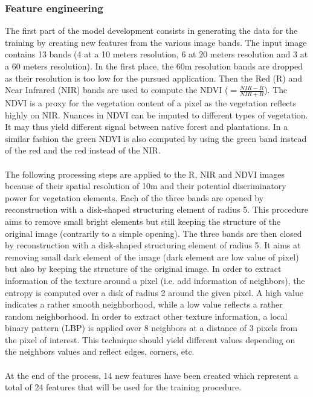 \documentclass[a4paper, 12pt]{article}
\begin{document}
        \subsubsection{Feature engineering}
            The first part of the model development consists in generating the data for the training by creating new features from the various image bands. The input image contains 13 bands (4 at a 10 meters resolution, 6 at 20 meters resolution and 3 at a 60 meters resolution). In the first place, the 60m resolution bands are dropped as their resolution is too low for the pursued application. Then the Red (R) and Near Infrared (NIR) bands are used to compute the NDVI ($= \tfrac{NIR - R}{NIR + R}$). The NDVI is a proxy for the vegetation content of a pixel as the vegetation reflects highly on NIR. Nuances in NDVI can be imputed to different types of vegetation. It may thus yield different signal between native forest and plantations. In a similar fashion the green NDVI is also computed by using the green band instead of the red and the red instead of the NIR.
            \\
            \\
            The following processing steps are applied to the R, NIR and NDVI images because of their spatial resolution of 10m and their potential discriminatory power for vegetation elements. Each of the three bands are opened by reconstruction with a disk-shaped structuring element of radius 5. This procedure aims to remove small bright elements but still keeping the structure of the original image (contrarily to a simple opening). The three bands are then closed by reconstruction with a disk-shaped structuring element of radius 5. It aims at removing small dark element of the image (dark element are low value of pixel) but also by keeping the structure of the original image. In order to extract information of the texture around a pixel (i.e. add information of neighbors), the entropy is computed over a disk of radius 2 around the given pixel. A high value indicates a rather smooth neighborhood, while a low value reflects a rather random neighborhood. In order to extract other texture information, a local binary pattern (LBP) is applied over 8 neighbors at a distance of 3 pixels from the pixel of interest. This technique should yield different values depending on the neighbors values and reflect edges, corners, etc.
            \\
            \\
            At the end of the process, 14 new features have been created which represent a total of 24 features that will be used for the training procedure.
\end{document}
